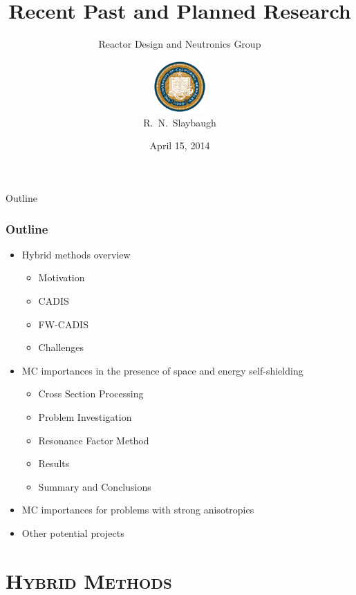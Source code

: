 \documentclass[xcolor=x11names,compress]{beamer}
\renewcommand{\(}{\begin{columns}}
\renewcommand{\)}{\end{columns}}
\newcommand{\<}[1]{\begin{column}{#1}}
\renewcommand{\>}{\end{column}}
\begin{document}
\begin{frame}
\title{Recent Past and Planned Research}
\subtitle{Reactor Design and Neutronics Group}
\author{
        \includegraphics[height=2cm]{bk}\\R.\ N.\ Slaybaugh}

\date{April 15, 2014}
\titlepage
\end{frame}

\begin{frame}[fragile]{Outline}
  \frametitle{Outline}
  \begin{itemize}
    \item Hybrid methods overview
    \begin{itemize}
     	\item Motivation
		\item CADIS
		\item FW-CADIS
		\item Challenges
    \end{itemize}
	\item MC importances in the presence of space and energy self-shielding
	\begin{itemize}
    		\item Cross Section Processing
		\item Problem Investigation
		\item Resonance Factor Method
		\item Results
		\item Summary and Conclusions
  	\end{itemize}
	\item MC importances for problems with strong anisotropies
	\item Other potential projects
  \end{itemize}

\end{frame}


\section{\scshape Hybrid Methods}
\end{document}
